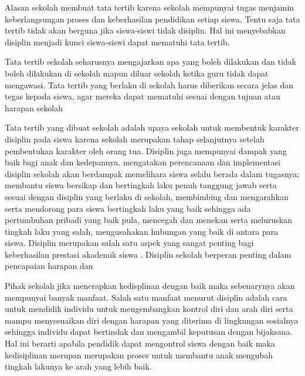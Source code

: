 \documentclass[f4paper,12pt, left=2.5cm,right=2cm,bottom=2cm, bahasa]{article}
\begin{document}
Alasan sekolah membuat tata tertib karena sekolah mempunyai tugas 
menjamin keberlangsungan proses dan keberhasilan pendidikan setiap siswa. 
Tentu saja tata tertib tidak akan berguna jika siswa-siswi tidak disiplin. Hal ini 
menyebabkan disiplin menjadi kunci siswa-siswi dapat mematuhi tata tertib. 

Tata tertib sekolah seharusnya mengajarkan apa yang boleh dilakukan dan tidak \cite{Widi_et_al_2018}
boleh dilakukan di sekolah mapun diluar sekolah ketika guru tidak dapat 
mengawasi. Tata tertib yang berlaku di sekolah harus diberikan secara jelas dan 
tegas kepada siswa, agar mereka dapat mematuhi sesuai dengan tujuan atau 
harapan sekolah

Tata tertib yang dibuat sekolah adalah upaya sekolah untuk membentuk 
karakter disiplin pada siswa karena sekolah merupakan tahap selanjutnya 
setelah pembentukan karakter oleh orang tua. Disiplin juga mempunyai dampak 
yang baik bagi anak dan kedepannya.\cite{tu2004peran} mengatakan perencanaan dan  implementasi
disiplin sekolah akan berdampak memelihara siswa selalu berada dalam tugasnya; membantu siswa bersikap dan bertingkah laku penuh tanggung jawab serta sesuai dengan disiplin yang berlaku di sekolah, membimbing dan mengarahkan serta mendorong para siswa bertingkah laku yang baik sehingga ada pertumbuhan pribadi yang baik pula, mencegah dan menekan serta meluruskan tingkah laku yang salah, mengusahakan hubungan yang baik di antara para siswa. 
Disiplin merupakan salah satu aspek yang sangat penting bagi keberhasilan prestasi 
akademik siswa . Disiplin sekolah berperan penting dalam pencapaian harapan dan 

Pihak sekolah jika menerapkan kedisplinan dengan baik maka sebenarynya akan mempunyai banyak manfaat. Salah satu manfaat menurut  \cite{Hurlock_1991} disiplin adalah cara untuk mendidik individu untuk mengembangkan kontrol diri dan arah diri serta mampu menyesuaikan diri dengan harapan yang diterima di lingkungan sosialnya sehingga individu dapat bertindak dan mengambil keputusan dengan bijaksana. Hal ini berarti apabila pendidik dapat mengontrol siswa dengan baik maka kedisiplinan merupan merupakan proses untuk membantu anak mengubah tingkah lakunya ke arah yang lebih baik. \cite{njoroge_2014}
\end{document}

